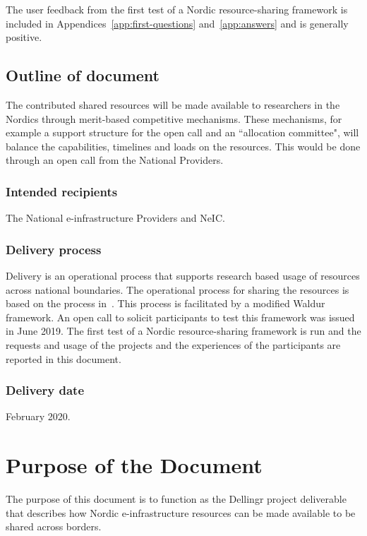 \documentclass{article}
\newcommand{\dell}{Dellingr\xspace}
\newcommand{\einfra}{e-infrastructure\xspace}
\newcommand{\pilot}{first test of a Nordic resource-sharing framework\xspace}
\begin{document}
The user feedback from the \pilot is included in Appendices~\ref{app:first-questions} and~\ref{app:answers} and is generally positive.

\subsection{Outline of document}

The contributed shared resources will be made available to researchers in the Nordics through merit-based competitive mechanisms. These mechanisms, for example a support structure for the open call and an ``allocation committee", will balance the capabilities, timelines and loads on the resources. This would be done through an open call from the National Providers.

\subsubsection{Intended recipients}

The National \einfra Providers and NeIC. 

\subsubsection{Delivery process}

Delivery is an operational process that supports research based usage of resources across national boundaries. 
The operational process for sharing the resources is based on the process in~\cite{dellingr-p2-do5}.
This process is facilitated by a modified Waldur~\cite{waldur} framework.
An open call to solicit participants to test this framework was issued in June 2019.
The \pilot is run and the requests and usage of the projects and the experiences of the participants are reported in this document.
\subsubsection{Delivery date}

February 2020.

\section{Purpose of the Document}

The purpose of this document is to function as the \dell project deliverable that describes how Nordic \einfra resources
can be made available to be shared across borders.
\end{document}
